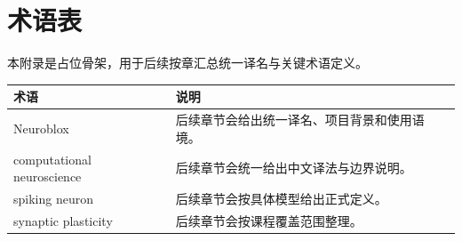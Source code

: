 \section{术语表}
本附录是占位骨架，用于后续按章汇总统一译名与关键术语定义。

\begin{longtable}{p{}p{}}
\textbf{术语} & \textbf{说明}\\
\hline
Neuroblox & 后续章节会给出统一译名、项目背景和使用语境。\\
computational neuroscience & 后续章节会统一给出中文译法与边界说明。\\
spiking neuron & 后续章节会按具体模型给出正式定义。\\
synaptic plasticity & 后续章节会按课程覆盖范围整理。\\
\end{longtable}
